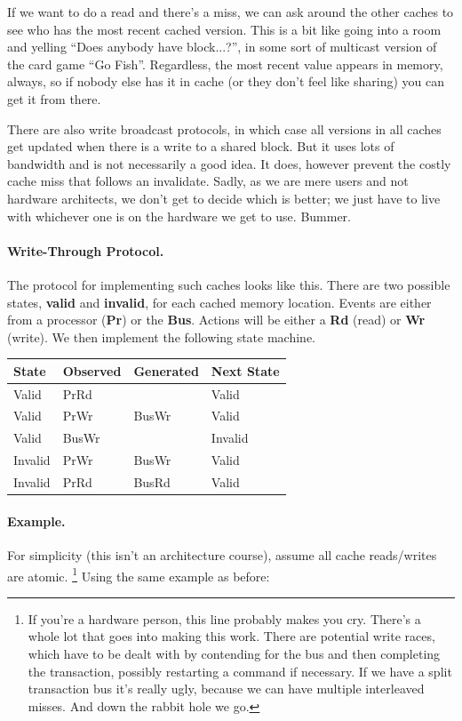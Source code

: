 \documentclass[a4paper]{report}
\begin{document}
If we want to do a read and there's a miss, we can ask around the other caches to see who has the most recent cached version. This is a bit like going into a room and yelling ``Does anybody have block...?'', in some sort of multicast version of the card game ``Go Fish''. Regardless, the most recent value appears in memory, always, so if nobody else has it in cache (or they don't feel like sharing) you can get it from there.

There are also write broadcast protocols, in which case all versions in all caches get updated when there is a write to a shared block. But it uses lots of bandwidth and is not necessarily a good idea. It does, however prevent the costly cache miss that follows an invalidate. Sadly, as we are mere users and not hardware architects, we don't get to decide which is better; we just have to live with whichever one is on the hardware we get to use. Bummer.

\paragraph{Write-Through Protocol.}
The protocol for implementing such caches looks like this.
There are two possible states, {\bf valid} and {\bf invalid}, for each cached memory location.
Events are either from a processor ({\bf Pr}) or the {\bf Bus}. Actions will be either a \textbf{Rd} (read) or \textbf{Wr} (write).
We then implement the following state machine.

  \begin{center}
    \begin{tabular}{l|l|l|l}
      {\bf State} & {\bf Observed} & {\bf Generated} & {\bf Next State}\\ \hline
      Valid   & PrRd  &       & Valid\\
      Valid   & PrWr  & BusWr & Valid\\
      Valid   & BusWr &       & Invalid\\
      Invalid & PrWr  & BusWr & Valid\\
      Invalid & PrRd  & BusRd & Valid\\
    \end{tabular}
  \end{center}

\paragraph{Example.} For simplicity (this isn't an architecture course), assume all cache
      reads/writes are atomic. \footnote{If you're a hardware person, this line probably makes you cry. There's a whole lot that goes into making this work. There are potential write races, which have to be dealt with by contending for the bus and then completing the transaction, possibly restarting a command if necessary. If we have a split transaction bus it's really ugly, because we can have multiple interleaved misses. And down the rabbit hole we go.} Using the same example as before:
\end{document}
